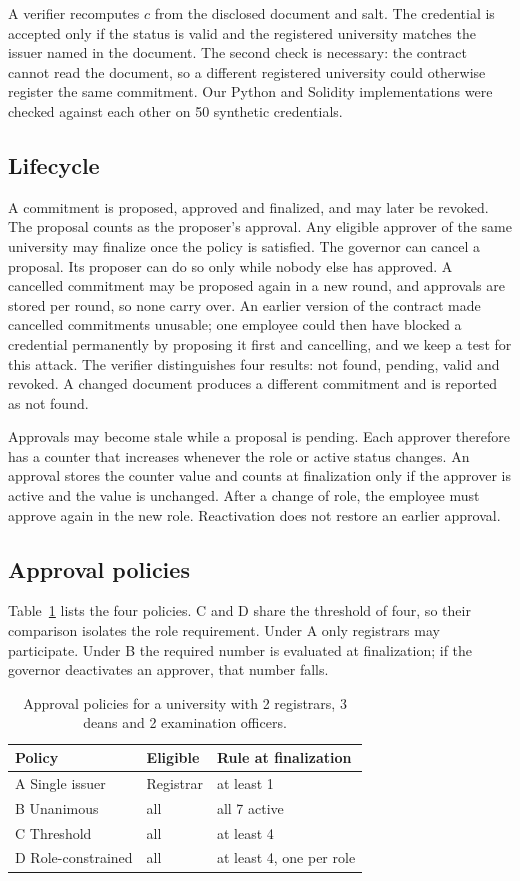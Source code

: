 A verifier recomputes $c$ from the disclosed document and salt. The credential is accepted only if the status is valid and the registered university matches the issuer named in the document. The second check is necessary: the contract cannot read the document, so a different registered university could otherwise register the same commitment. Our Python and Solidity implementations were checked against each other on 50 synthetic credentials.

\subsection{Lifecycle}
A commitment is proposed, approved and finalized, and may later be revoked. The proposal counts as the proposer's approval. Any eligible approver of the same university may finalize once the policy is satisfied. The governor can cancel a proposal. Its proposer can do so only while nobody else has approved. A cancelled commitment may be proposed again in a new round, and approvals are stored per round, so none carry over. An earlier version of the contract made cancelled commitments unusable; one employee could then have blocked a credential permanently by proposing it first and cancelling, and we keep a test for this attack. The verifier distinguishes four results: not found, pending, valid and revoked. A changed document produces a different commitment and is reported as not found.

Approvals may become stale while a proposal is pending. Each approver therefore has a counter that increases whenever the role or active status changes. An approval stores the counter value and counts at finalization only if the approver is active and the value is unchanged. After a change of role, the employee must approve again in the new role. Reactivation does not restore an earlier approval.

\subsection{Approval policies}
Table~\ref{tab:policies} lists the four policies. C and D share the threshold of four, so their comparison isolates the role requirement. Under A only registrars may participate. Under B the required number is evaluated at finalization; if the governor deactivates an approver, that number falls.

\begin{table}[t]
\centering\small
\caption{Approval policies for a university with 2 registrars, 3 deans and 2 examination officers.}
\label{tab:policies}
\begin{tabular}{lll}
\toprule
Policy & Eligible & Rule at finalization\\
\midrule
A Single issuer & Registrar & at least 1\\
B Unanimous & all & all 7 active\\
C Threshold & all & at least 4\\
D Role-constrained & all & at least 4, one per role\\
\bottomrule
\end{tabular}
\end{table}

